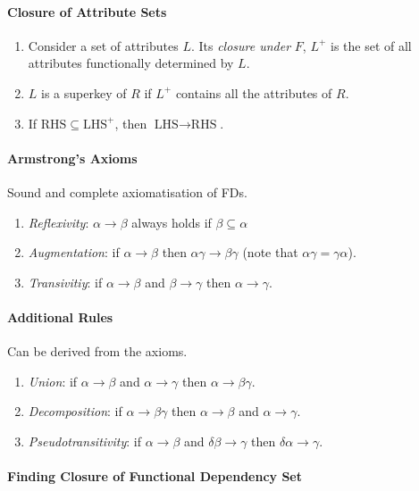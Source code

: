 \documentclass[twocolumn,english]{article}
\begin{document}
\paragraph{Closure of Attribute Sets}
\begin{enumerate}
\item Consider a set of attributes $L$. Its \emph{closure under} $F$,
$L^{+}$ is the set of all attributes functionally determined by $L$. 
\item $L$ is a superkey of $R$ if $L^{+}$ contains all the attributes
of $R$. 
\item If $\mbox{RHS}\subseteq\mbox{LHS}^{+}$, then $\mbox{LHS}\rightarrow\mbox{RHS}$. 
\end{enumerate}

\paragraph{Armstrong's Axioms}

Sound and complete axiomatisation of FDs. 
\begin{enumerate}
\item \emph{Reflexivity}: $\alpha\rightarrow\beta$ always holds if $\beta\subseteq\alpha$ 
\item \emph{Augmentation}: if $\alpha\rightarrow\beta$ then $\alpha\gamma\rightarrow\beta\gamma$
(note that $\alpha\gamma=\gamma\alpha$). 
\item \emph{Transivitiy}: if $\alpha\rightarrow\beta$ and $\beta\rightarrow\gamma$
then $\alpha\rightarrow\gamma$. 
\end{enumerate}

\paragraph{Additional Rules}

Can be derived from the axioms. 
\begin{enumerate}
\item \emph{Union}: if $\alpha\rightarrow\beta$ and $\alpha\rightarrow\gamma$
then $\alpha\rightarrow\beta\gamma$. 
\item \emph{Decomposition}: if $\alpha\rightarrow\beta\gamma$ then $\alpha\rightarrow\beta$
and $\alpha\rightarrow\gamma$. 
\item \emph{Pseudotransitivity}: if $\alpha\rightarrow\beta$ and $\delta\beta\rightarrow\gamma$
then $\delta\alpha\rightarrow\gamma$. 
\end{enumerate}

\paragraph{Finding Closure of Functional Dependency Set}
\end{document}
